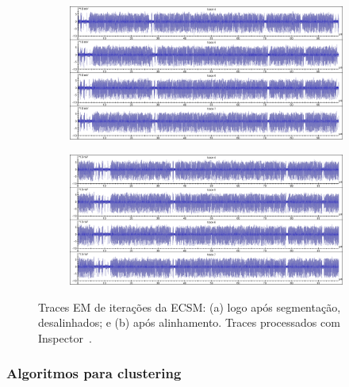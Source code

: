 \begin{figure}
	\label{fig:traceAlignment}
	\centering
	\begin{subfigure}[b]{0.8\textwidth}
		\includegraphics[width=1\linewidth]{figures/Traces_EM___MontLadder___CPU_168MHz___SR_1GHz___28MS___Misaligned.png}
		\caption{}
		\label{fig:misaligned} 
	\end{subfigure}
	
	\begin{subfigure}[b]{0.8\textwidth}
		\includegraphics[width=1\linewidth]{figures/Traces_EM___MontLadder___CPU_168MHz___SR_1GHz___28MS___Aligned.png}
		\caption{}
		\label{fig:aligned}
	\end{subfigure}	
	
	\caption{Traces EM de iterações da ECSM: (a) logo após segmentação, desalinhados; e (b) após alinhamento. Traces processados com Inspector~\cite{RiscureInspector}.}
\end{figure}

\subsubsection{Algoritmos para clustering}

